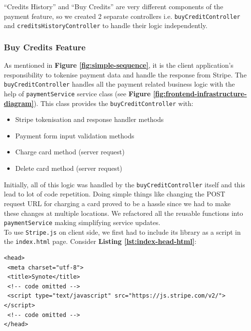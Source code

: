 “Credits History” and “Buy Credits” are very different components of the payment feature, so we created 2 separate controllers i.e. \texttt{buyCreditController} and \texttt{creditsHistoryController} to handle their logic independently.

\subsubsection{Buy Credits Feature}
\label{subsubsec:buy-credits-feature}

As mentioned in \textbf{Figure \ref{fig:simple-sequence}}, it is the client application's responsibility to tokenise payment data and handle the response from Stripe. The \texttt{buyCreditController} handles all the payment related business logic with the help of \texttt{paymentService} service class (see \textbf{Figure \ref{fig:frontend-infrastructure-diagram}}). This class provides the \texttt{buyCreditController} with:

\begin{itemize}
\item Stripe tokenisation and response handler methods
\item Payment form input validation methods
\item Charge card method (server request)
\item Delete card method (server request)
\end{itemize}

Initially, all of this logic was handled by the \texttt{buyCreditController} itself and this lead to lot of code repetition. Doing simple things like changing the POST request URL for charging a card proved to be a hassle since we had to make these changes at multiple locations. We refactored all the reusable functions into \texttt{paymentService} making simplifying service updates. \\

To use \texttt{Stripe.js} on client side, we first had to include its library as a script in the \texttt{index.html} page. Consider \textbf{Listing \ref{lst:index-head-html}}:\\

\begin{listing}[H]
\begin{verbatim}
<head>
 <meta charset="utf-8">
 <title>Synote</title>
 <!-- code omitted -->
 <script type="text/javascript" src="https://js.stripe.com/v2/"></script>
 <!-- code omitted -->
</head>
\end{verbatim}
\label{lst:index-head-html}
\end{listing}

